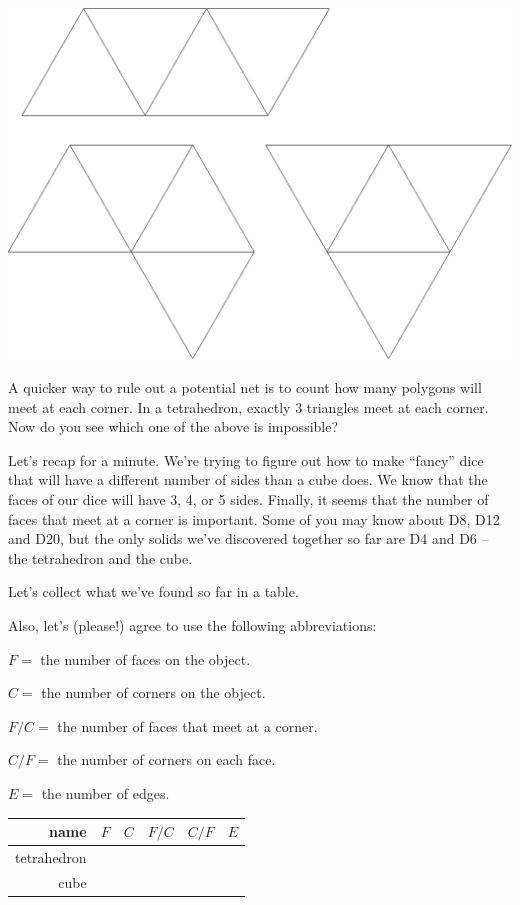 \centerline{\includegraphics[scale=.25]{images/tetrahedron_nets.png}}
\wbnewpage

A quicker way to rule out a potential net is to count how many polygons will meet at each corner.  In a tetrahedron, exactly $3$ triangles meet at each corner. Now do you see which one of the above is impossible?

\wbvfill

Let's recap for a minute.  We're trying to figure out how to make ``fancy'' dice that will have a different number of sides than a cube does.  We know that the faces of our dice will have 3, 4, or 5 sides.  Finally, it seems that the number of faces that meet at a corner is important.  Some of you may know about D8, D12 and D20, but the only solids we've discovered together so far are D4 and D6 -- the tetrahedron and the cube.

Let's collect what we've found so far in a table.

Also, let's (please!) agree to use the following abbreviations:

$F =$ the number of faces on the object.

$C =$ the number of corners on the object.

$F/C =$ the number of faces that meet at a corner.

$C/F =$ the number of corners on each face.

$E =$ the number of edges.
\bigskip

\begin{tabular}{r|c|c|c|c|c} 
\bigstrut name & $F$ & $C$ & $F/C$ & $C/F$ & $E$ \\ \hline
\bigstrut tetrahedron & \hstrut & \hstrut & \hstrut & \hstrut & \hstrut \\ \hline
\bigstrut cube & & & & & 
\end{tabular}

